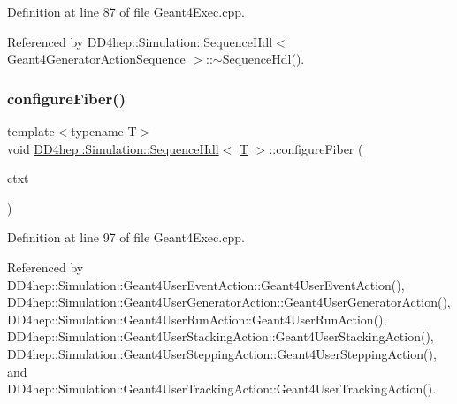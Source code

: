 Definition at line 87 of file Geant4\+Exec.\+cpp.



Referenced by D\+D4hep\+::\+Simulation\+::\+Sequence\+Hdl$<$ Geant4\+Generator\+Action\+Sequence $>$\+::$\sim$\+Sequence\+Hdl().

\hypertarget{class_d_d4hep_1_1_simulation_1_1_sequence_hdl_a4672c0e560cdc353b48c8025c9d3546f}{}\label{class_d_d4hep_1_1_simulation_1_1_sequence_hdl_a4672c0e560cdc353b48c8025c9d3546f} 
\subsubsection{\texorpdfstring{configure\+Fiber()}{configureFiber()}}
{\footnotesize\ttfamily template$<$typename T$>$ \\
void \hyperlink{class_d_d4hep_1_1_simulation_1_1_sequence_hdl}{D\+D4hep\+::\+Simulation\+::\+Sequence\+Hdl}$<$ \hyperlink{class_t}{T} $>$\+::configure\+Fiber (\begin{DoxyParamCaption}\item[{\hyperlink{class_d_d4hep_1_1_simulation_1_1_geant4_context}{Geant4\+Context} $\ast$}]{ctxt }\end{DoxyParamCaption})\hspace{0.3cm}{\ttfamily [inline]}}



Definition at line 97 of file Geant4\+Exec.\+cpp.



Referenced by D\+D4hep\+::\+Simulation\+::\+Geant4\+User\+Event\+Action\+::\+Geant4\+User\+Event\+Action(), D\+D4hep\+::\+Simulation\+::\+Geant4\+User\+Generator\+Action\+::\+Geant4\+User\+Generator\+Action(), D\+D4hep\+::\+Simulation\+::\+Geant4\+User\+Run\+Action\+::\+Geant4\+User\+Run\+Action(), D\+D4hep\+::\+Simulation\+::\+Geant4\+User\+Stacking\+Action\+::\+Geant4\+User\+Stacking\+Action(), D\+D4hep\+::\+Simulation\+::\+Geant4\+User\+Stepping\+Action\+::\+Geant4\+User\+Stepping\+Action(), and D\+D4hep\+::\+Simulation\+::\+Geant4\+User\+Tracking\+Action\+::\+Geant4\+User\+Tracking\+Action().

\hypertarget{class_d_d4hep_1_1_simulation_1_1_sequence_hdl_acccabdfcac241cb5c7efdf92e549ded9}{}\label{class_d_d4hep_1_1_simulation_1_1_sequence_hdl_acccabdfcac241cb5c7efdf92e549ded9} 
